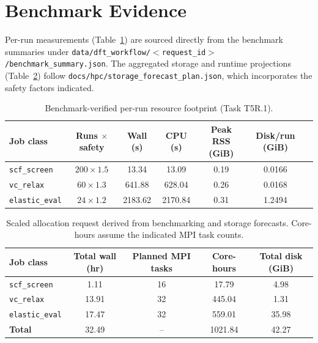 \documentclass[11pt]{article}
\begin{document}
\section*{Benchmark Evidence}
Per-run measurements (Table~\ref{tab:per-run}) are sourced directly from the benchmark summaries under \texttt{data/dft\_workflow/\(<\)request\_id\(>\)/benchmark\_summary.json}. The aggregated storage and runtime projections (Table~\ref{tab:scaled}) follow \texttt{docs/hpc/storage\_forecast\_plan.json}, which incorporates the safety factors indicated.

\begin{table}[htbp]
  \centering
  \caption{Benchmark-verified per-run resource footprint (Task T5R.1).}
  \label{tab:per-run}
  \begin{tabular}{@{}lcccccc@{}}
    \toprule
    Job class & Runs $\times$ safety & Wall (s) & CPU (s) & Peak RSS (GiB) & Disk/run (GiB) \\
    \midrule
    \texttt{scf\_screen} & \(200 \times 1.5\) & \num{13.34} & \num{13.09} & \num{0.19} & \num{0.0166} \\
    \texttt{vc\_relax} & \(60 \times 1.3\) & \num{641.88} & \num{628.04} & \num{0.26} & \num{0.0168} \\
    \texttt{elastic\_eval} & \(24 \times 1.2\) & \num{2183.62} & \num{2170.84} & \num{0.31} & \num{1.2494} \\
    \bottomrule
  \end{tabular}
\end{table}

\begin{table}[htbp]
  \centering
  \caption{Scaled allocation request derived from benchmarking and storage forecasts. Core-hours assume the indicated MPI task counts.}
  \label{tab:scaled}
  \begin{tabular}{@{}lcccc@{}}
    \toprule
    Job class & Total wall (hr) & Planned MPI tasks & Core-hours & Total disk (GiB) \\
    \midrule
    \texttt{scf\_screen} & \num{1.11} & 16 & \num{17.79} & \num{4.98} \\
    \texttt{vc\_relax} & \num{13.91} & 32 & \num{445.04} & \num{1.31} \\
    \texttt{elastic\_eval} & \num{17.47} & 32 & \num{559.01} & \num{35.98} \\
    \midrule
    \textbf{Total} & \num{32.49} & -- & \num{1021.84} & \num{42.27} \\
    \bottomrule
  \end{tabular}
\end{table}
\end{document}
